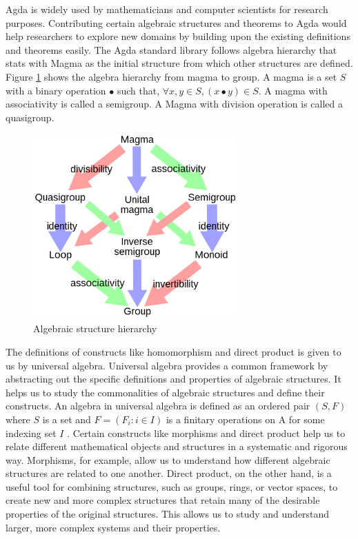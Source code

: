 Agda is widely used by mathematicians and computer scientists for research
purposes. Contributing certain algebraic structures and theorems to Agda would
help researchers to explore new domains by building upon the existing
definitions and theorems easily. The Agda standard library follows algebra
hierarchy that stats with Magma as the initial structure from which other
structures are defined. Figure \ref{fig_magma} shows the algebra hierarchy from
magma to group. A magma is a set $S$ with a binary operation $∙$ such that,
$\forall x,y \in S, (x ∙ y) \in S$. A magma with associativity is called a
semigroup. A Magma with division operation is called a quasigroup.
\begin{figure}[ht]
	\centering
	\includegraphics[width=0.7\textwidth]{figures/Sample/Magma_to_group.jpg}
	\caption{Algebraic structure hierarchy \cite{enwiki:1107380309}}
	\label{fig_magma}
 \end{figure}
The definitions of constructs like homomorphism and direct product is given to
us by universal algebra. Universal algebra provides a common framework by
abstracting out the specific definitions and properties of algebraic structures.
It helps us to study the commonalities of algebraic structures and define their
constructs. An algebra in universal algebra is defined as an ordered pair
$(S,F)$ where $S$ is a set and $F = (F_i:i\in I)$ is a finitary operations on A
for some indexing set $I$ \cite{sannella2012foundations}. Certain constructs
like morphisms and direct product help us to relate different mathematical
objects and structures in a systematic and rigorous way. Morphisms, for example,
allow us to understand how different algebraic structures are related to one
another. Direct product, on the other hand, is a useful tool for combining
structures, such as groups, rings, or vector spaces, to create new and more
complex structures that retain many of the desirable properties of the original
structures. This allows us to study and understand larger, more complex systems
and their properties.

